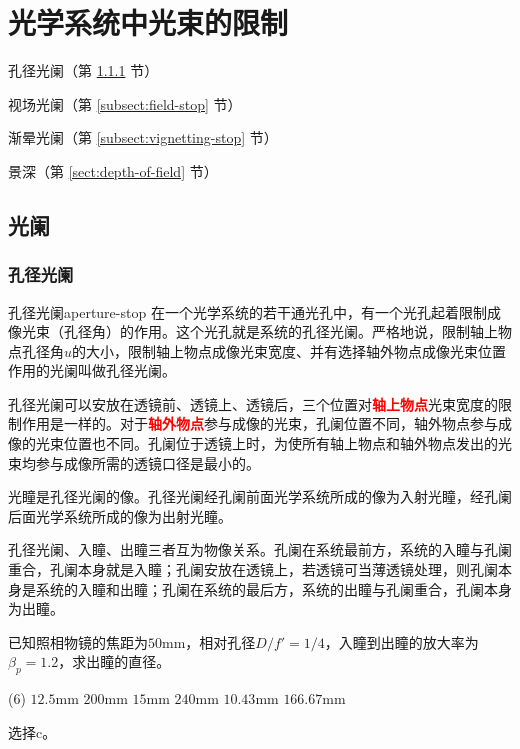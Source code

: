 \documentclass[cn,10pt,chinesefont=founder,math=newtx,cite=super,twoside]{elegantbook}
\begin{document}
\chapter{光学系统中光束的限制}

\begin{introduction}
	\item 孔径光阑（第 \ref{subsect:aperture-stop} 节）
	\item 视场光阑（第 \ref{subsect:field-stop} 节）
	\item 渐晕光阑（第 \ref{subsect:vignetting-stop} 节）
	\item 景深（第 \ref{sect:depth-of-field} 节）
\end{introduction}

\section{光阑}
\subsection{孔径光阑}
\label{subsect:aperture-stop}
\begin{definition}{孔径光阑}{aperture-stop}
在一个光学系统的若干通光孔中，有一个光孔起着限制成像光束（孔径角）的作用。这个光孔就是系统的孔径光阑。严格地说，限制轴上物点孔径角$u$的大小，限制轴上物点成像光束宽度、并有选择轴外物点成像光束位置作用的光阑叫做孔径光阑。
\end{definition}

孔径光阑可以安放在透镜前、透镜上、透镜后，三个位置对\textcolor{red}{\textbf{轴上物点}}光束宽度的限制作用是一样的。对于\textcolor{red}{\textbf{轴外物点}}参与成像的光束，孔阑位置不同，轴外物点参与成像的光束位置也不同。孔阑位于透镜上时，为使所有轴上物点和轴外物点发出的光束均参与成像所需的透镜口径是最小的。

光瞳是孔径光阑的像。孔径光阑经孔阑前面光学系统所成的像为入射光瞳，经孔阑后面光学系统所成的像为出射光瞳。

孔径光阑、入瞳、出瞳三者互为物像关系。孔阑在系统最前方，系统的入瞳与孔阑重合，孔阑本身就是入瞳；孔阑安放在透镜上，若透镜可当薄透镜处理，则孔阑本身是系统的入瞳和出瞳；孔阑在系统的最后方，系统的出瞳与孔阑重合，孔阑本身为出瞳。

\begin{problem}
	已知照相物镜的焦距为$50$mm，相对孔径$D/f'=1/4$，入瞳到出瞳的放大率为$\beta_p=1.2$，求出瞳的直径。 
	\begin{tasks}(6)
		\task $12.5$mm
		\task $200$mm
		\task $15$mm
		\task $240$mm
		\task $10.43$mm
		\task $166.67$mm
	\end{tasks}
\end{problem}
\begin{solution}
	选择c。
\end{solution}
\end{document}
